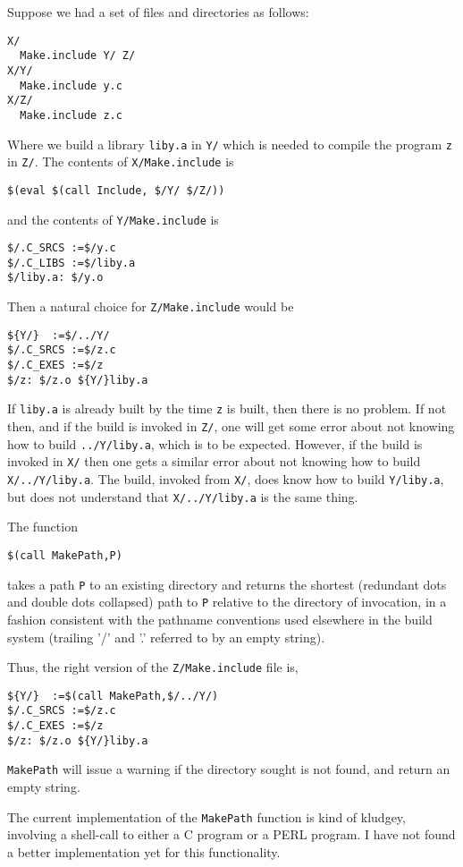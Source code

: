 \documentclass[letterpaper]{article}
\begin{document}
Suppose we had a set of files and directories as follows:
\begin{verbatim}
X/
  Make.include Y/ Z/
X/Y/
  Make.include y.c
X/Z/
  Make.include z.c
\end{verbatim}
Where we build a library \verb+liby.a+ in \verb+Y/+ which is needed to
compile the program \verb+z+ in \verb+Z/+.  The contents of
\verb+X/Make.include+ is
\begin{verbatim}
$(eval $(call Include, $/Y/ $/Z/))
\end{verbatim}
and the contents of \verb+Y/Make.include+ is
\begin{verbatim}
$/.C_SRCS :=$/y.c
$/.C_LIBS :=$/liby.a
$/liby.a: $/y.o
\end{verbatim}
Then a natural choice for \verb+Z/Make.include+ would be
\begin{verbatim}
${Y/}  :=$/../Y/
$/.C_SRCS :=$/z.c
$/.C_EXES :=$/z
$/z: $/z.o ${Y/}liby.a
\end{verbatim}
If \verb+liby.a+ is already built by the time \verb+z+ is
built, then there is no problem.  If not then, and if the build
is invoked in \verb+Z/+, one will get some error about not
knowing how to build \verb+../Y/liby.a+, which is to be expected.
However, if the build is invoked in \verb+X/+ then one gets
a similar error about not knowing how to build \verb+X/../Y/liby.a+.
The build, invoked from \verb+X/+, does know how to build \verb+Y/liby.a+,
but does not understand that \verb+X/../Y/liby.a+ is the same thing.

The function
\begin{verbatim}
$(call MakePath,P)
\end{verbatim}
takes a path \verb+P+ to an existing directory and returns the
shortest (redundant dots and double dots collapsed) path to \verb+P+
relative to the directory of invocation, in a fashion consistent with
the pathname conventions used elsewhere in the build system (trailing
'/' and '.' referred to by an empty string).

Thus, the right version of the \verb+Z/Make.include+ file is,
\begin{verbatim}
${Y/}  :=$(call MakePath,$/../Y/)
$/.C_SRCS :=$/z.c
$/.C_EXES :=$/z
$/z: $/z.o ${Y/}liby.a
\end{verbatim}
\verb+MakePath+ will issue a warning if the directory sought
is not found, and return an empty string.

The current implementation of the \verb+MakePath+ function is kind of
kludgey, involving a shell-call to either a C program or a PERL
program.  I have not found a better implementation yet for this
functionality.
\end{document}
